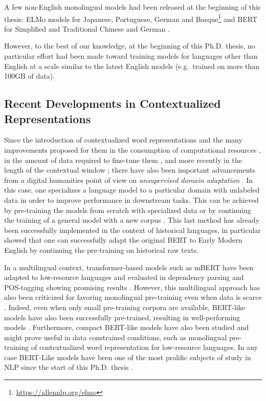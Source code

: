 A few non-English monolingual models had been released at the beginning of this thesis: ELMo models for Japanese, Portuguese, German and Basque\footnote{\url{https://allennlp.org/elmo}} and BERT for Simplified and Traditional Chinese \citep{devlin-etal-2019-bert} and German \citep{chan-etal-2019-german}.

However, to the best of our knowledge, at the beginning of this Ph.D. thesis, no particular effort had been made toward training models for languages other than English at a scale similar to the latest English models (e.g.~\roberta trained on more than 100GB of data).

\subsection{Recent Developments in Contextualized Representations}
Since the introduction of contextualized word representations \citep{peters-etal-2018-deep,akbik-etal-2018-contextual,devlin-etal-2019-bert} and the many improvements proposed for them in the consumption of computational resources \citep{clark-etal-2020-electra}, in the amount of data required to fine-tune them \citep{raffel-etal-2020-exploring}, and more recently in the length of the contextual window \citep{xiong-etal-2021-nystromformer}; there have also been important advancements from a digital humanities point of view on \emph{unsupervised domain adaptation} \citep{ramponi-plank-2020-neural}. In this case, one specializes a language model to a particular domain with unlabeled data in order to improve performance in downstream tasks. This can be achieved by  pre-training the models from scratch with specialized data \citep{beltagy-etal-2019-scibert} or by continuing the training of a general model with a new corpus \citep{lee-etal-2019-BioBERT, peng-etal-2019-transfer}. This last method has already been successfully implemented in the context of historical languages, in particular \citet{han-eisenstein-2019-unsupervised} showed that one can successfully adapt the original BERT \citep{devlin-etal-2019-bert} to Early Modern English by continuing the pre-training on historical raw texts.

In a multilingual context, transformer-based models such as mBERT have been adapted to low-resource languages and evaluated in dependency parsing and POS-tagging showing promising results \citep{chau-etal-2020-parsing, muller-etal-2021-unseen, gururangan-etal-2020-dont, wang-etal-2020-extending}. However, this multilingual approach has also been criticized for favoring monolingual pre-training even when data is scarce \citep{virtanen-etal-2019-multilingual, ortiz-suarez-etal-2020-monolingual}. Indeed, even when only small pre-training corpora are available, BERT-like models have also been successfully pre-trained, resulting in well-performing models \citep{micheli-etal-2020-importance}. Furthermore, compact BERT-like models have also been studied \citep{turc-etal-2019-well} and might prove useful in data constrained conditions, such as monolingual pre-training of contextualized word representation for low-resource languages. In any case BERT-Like models have been one of the most prolific subjects of study in NLP since the start of this Ph.D. thesis \citep{rogers-etal-2020-primer}.

